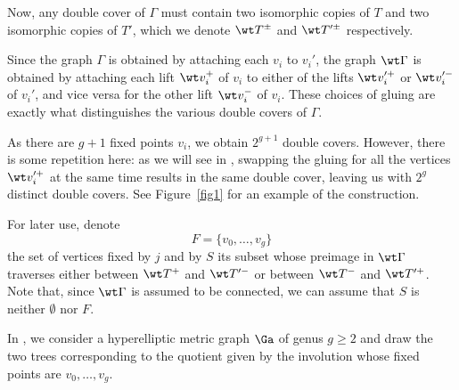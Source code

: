 {Now, any double cover of $\Gamma$ must contain two isomorphic copies of $T$ and two isomorphic copies of $T'$, which we denote  $\wt T^{\pm}$ and $\wt T'^{\pm}$ respectively. 

Since the graph $\Gamma$ is obtained by attaching each  $v_i$ to $v_i'$, the graph $\wt\Gamma$ is obtained by attaching each lift $\wt v_i^+$ of $v_i$ to either of the lifts $\wt v_i'^+$ or  $\wt v_i'^-$ of $v_i'$, and vice versa for the other lift $\wt v_i^-$ of $v_i$. These choices of gluing  are exactly what distinguishes the various double covers of $\Gamma$. 


As there are $g+1$ fixed points $v_i$, we obtain $2^{g+1}$ double covers. However, there is some repetition here: as we will see in ,
swapping the gluing for all the vertices $\wt v_i'^+$ at the same time results in the same double cover, leaving us with $2^g$ distinct double covers.  
 See Figure~\ref{fig1} for an example of the construction.
 
For later use, denote 
\begin{equation}
   F=\{v_0,\ldots, v_g\}
\end{equation}
the set of vertices fixed by $j$ and by $S$ its subset whose preimage in $\wt\Gamma$ traverses either between $\wt T^{+}$ and $\wt T'^{-}$ or between $\wt T^{-}$ and $\wt T'^{+}$. Note that, since $\wt\Gamma$ is assumed to be connected, we can assume that $S$ is neither $\emptyset$ nor $F$. 

\begin{exam}
In , we consider a hyperelliptic metric graph $\Ga$ of genus $g\geq 2$ and draw the two trees corresponding to the quotient given by the involution whose fixed points are $v_0,\dots,v_g$. 

\begin{figure}[ht]
\centering


\end{figure}
\end{exam}}
